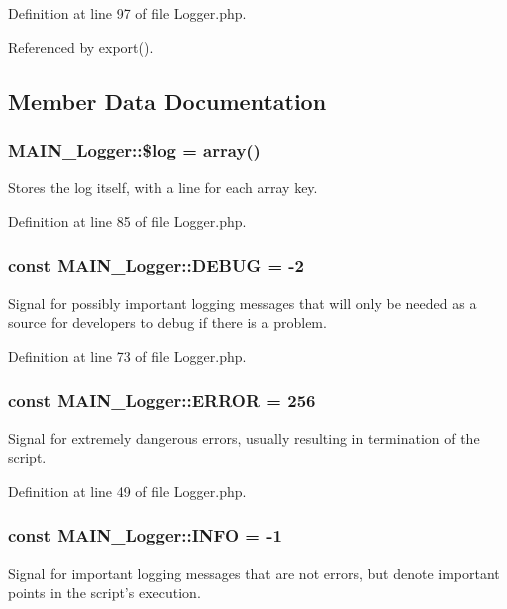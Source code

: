 Definition at line 97 of file Logger.php.

Referenced by export().

\subsection{Member Data Documentation}
\hypertarget{classMAIN__Logger_afa86bba01c2165e0cb2aaa9faaae372b}{
\subsubsection[{\$log}]{\setlength{\rightskip}{0pt plus 5cm}MAIN\_\-Logger::\$log = array()}}
\label{d3/dff/classMAIN__Logger_afa86bba01c2165e0cb2aaa9faaae372b}
Stores the log itself, with a line for each array key. 

Definition at line 85 of file Logger.php.\hypertarget{classMAIN__Logger_ac7a1e837542ce1762a63d2713060c4ae}{
\subsubsection[{DEBUG}]{\setlength{\rightskip}{0pt plus 5cm}const {\bf MAIN\_\-Logger::DEBUG} = -\/2}}
\label{d3/dff/classMAIN__Logger_ac7a1e837542ce1762a63d2713060c4ae}
Signal for possibly important logging messages that will only be needed as a source for developers to debug if there is a problem. 

Definition at line 73 of file Logger.php.\hypertarget{classMAIN__Logger_a2af8dfdb8d9e1b23122783c5d85e2da0}{
\subsubsection[{ERROR}]{\setlength{\rightskip}{0pt plus 5cm}const {\bf MAIN\_\-Logger::ERROR} = 256}}
\label{d3/dff/classMAIN__Logger_a2af8dfdb8d9e1b23122783c5d85e2da0}
Signal for extremely dangerous errors, usually resulting in termination of the script. 

Definition at line 49 of file Logger.php.\hypertarget{classMAIN__Logger_a7583fcdf96a9dba7c0ec52637e1d11d7}{
\subsubsection[{INFO}]{\setlength{\rightskip}{0pt plus 5cm}const {\bf MAIN\_\-Logger::INFO} = -\/1}}
\label{d3/dff/classMAIN__Logger_a7583fcdf96a9dba7c0ec52637e1d11d7}
Signal for important logging messages that are not errors, but denote important points in the script's execution. 


